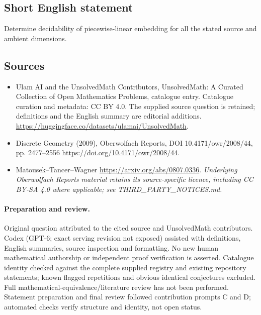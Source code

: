 \documentclass[11pt]{article}
\begin{document}
\subsection{Short English statement}
Determine decidability of piecewise-linear embedding for all the stated source and ambient dimensions.
\subsection{Sources}
\begin{itemize}
\item[\hypertarget{source:statement:1}{S1}] Ulam AI and the UnsolvedMath Contributors, UnsolvedMath: A Curated Collection of Open Mathematics Problems, catalogue entry. Catalogue curation and metadata: CC BY 4.0. The supplied source question is retained; definitions and the English summary are editorial additions.
\url{https://huggingface.co/datasets/ulamai/UnsolvedMath}.
\item[\hypertarget{source:statement:2}{S2}] Discrete Geometry (2009), Oberwolfach Reports, DOI 10.4171/owr/2008/44, pp. 2477--2556
\url{https://doi.org/10.4171/owr/2008/44}.
\item[\hypertarget{source:statement:3}{S3}] Matousek--Tancer--Wagner
\url{https://arxiv.org/abs/0807.0336}.
\textit{Underlying Oberwolfach Reports material retains its source-specific licence, including CC BY-SA 4.0 where applicable; see THIRD\_PARTY\_NOTICES.md.}
\end{itemize}
\paragraph{Preparation and review.}
Original question attributed to the cited source and UnsolvedMath contributors. Codex (GPT-6; exact serving revision not exposed) assisted with definitions, English summaries, source inspection and formatting. No new human mathematical authorship or independent proof verification is asserted. Catalogue identity checked against the complete supplied registry and existing repository statements; known flagged repetitions and obvious identical conjectures excluded. Full mathematical-equivalence/literature review has not been performed. Statement preparation and final review followed contribution prompts C and D; automated checks verify structure and identity, not open status.
\label{end:statement}
\end{document}
